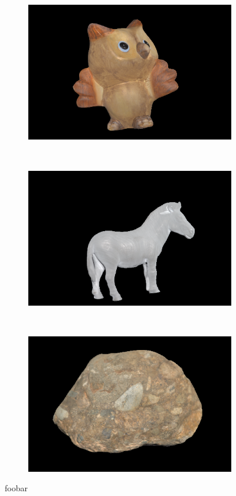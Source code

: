 \documentclass{paper}
\begin{document}
\begin{figure}[h!]
     \begin{subfigure}{0.3\textwidth}
        \includegraphics[width=\textwidth]{results/owl/owl_a_rgb}
    \end{subfigure}
    ~
    \begin{subfigure}{0.3\textwidth}
        \includegraphics[width=\textwidth]{results/horse/horse_a_rgb}
    \end{subfigure}
    ~
    \begin{subfigure}{0.3\textwidth}
        \includegraphics[width=\textwidth]{results/rock/rock_a_rgb}
    \end{subfigure}
    \caption{foobar}
    \label{fig:albeldo_rgb}       
\end{figure}
\end{document}
